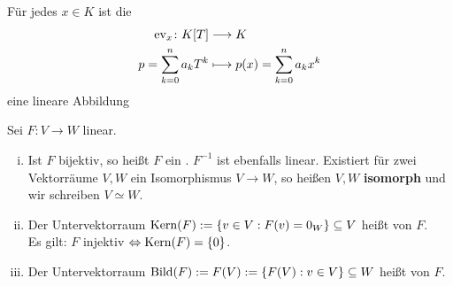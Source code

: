 \begin{beispiel}[Auswertungsabbildung]
	\label{bsp:I.5.8}
	Für jedes $x \in K$ ist die 
	\begin{align*}
		\operatorname{ev}_x \colon K[T] &\longrightarrow K \\
		p = \sum_{k=0}^{n} a_kT^k &\longmapsto p(x) = \sum_{k=0}^{n} a_kx^k
	\end{align*}
	eine lineare Abbildung
\end{beispiel}

\begin{definition}
	\label{def:I.5.9}
	Sei $F\colon V \rightarrow W$ linear.
	\begin{enumerate}[(i)]
		\item Ist $F$ bijektiv, so heißt $F$ ein .
		$F^{-1}$ ist ebenfalls linear.
		Existiert für zwei Vektorräume $V,W$ ein Isomorphismus $V \rightarrow W$, so heißen $V,W$ \textbf{isomorph} und wir schreiben $V \simeq W$.
		\item Der Untervektorraum $\operatorname{Kern}(F) := \{v \in V : F(v) = 0_W\} \subseteq V$ heißt  von $F$. \\
		Es gilt: $F$ injektiv $\Leftrightarrow \operatorname{Kern}(F) = \{0\}$.
		\item Der Untervektorraum $\operatorname{Bild}(F) := F(V) := \{F(V) : v \in V\} \subseteq W$ heißt  von $F$.
	\end{enumerate}
\end{definition}
\cleardoubleoddemptypage
